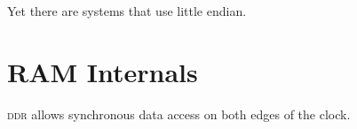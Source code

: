 
Yet there are systems that use little endian. %



\section{RAM Internals}







\textsc{ddr} allows synchronous data access on both edges of the clock.